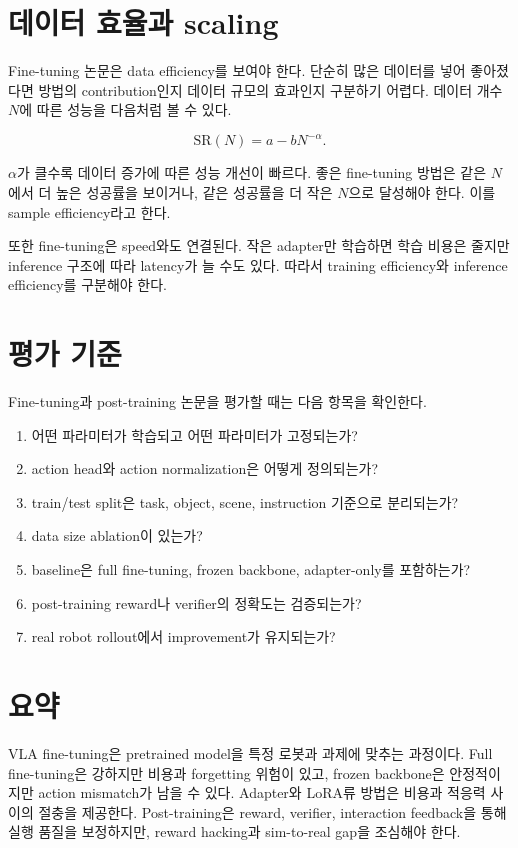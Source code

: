 \section{데이터 효율과 scaling}

Fine-tuning 논문은 data efficiency를 보여야 한다. 단순히 많은 데이터를 넣어 좋아졌다면 방법의 contribution인지 데이터 규모의 효과인지 구분하기 어렵다. 데이터 개수 $N$에 따른 성능을 다음처럼 볼 수 있다.

\begin{equation}
  \mathrm{SR}(N)
  =
  a - bN^{-\alpha}.
\end{equation}

$\alpha$가 클수록 데이터 증가에 따른 성능 개선이 빠르다. 좋은 fine-tuning 방법은 같은 $N$에서 더 높은 성공률을 보이거나, 같은 성공률을 더 작은 $N$으로 달성해야 한다. 이를 sample efficiency라고 한다.

또한 fine-tuning은 speed와도 연결된다. 작은 adapter만 학습하면 학습 비용은 줄지만 inference 구조에 따라 latency가 늘 수도 있다. 따라서 training efficiency와 inference efficiency를 구분해야 한다.

\section{평가 기준}

Fine-tuning과 post-training 논문을 평가할 때는 다음 항목을 확인한다.

\begin{enumerate}
  \item 어떤 파라미터가 학습되고 어떤 파라미터가 고정되는가?
  \item action head와 action normalization은 어떻게 정의되는가?
  \item train/test split은 task, object, scene, instruction 기준으로 분리되는가?
  \item data size ablation이 있는가?
  \item baseline은 full fine-tuning, frozen backbone, adapter-only를 포함하는가?
  \item post-training reward나 verifier의 정확도는 검증되는가?
  \item real robot rollout에서 improvement가 유지되는가?
\end{enumerate}

\section{요약}

VLA fine-tuning은 pretrained model을 특정 로봇과 과제에 맞추는 과정이다. Full fine-tuning은 강하지만 비용과 forgetting 위험이 있고, frozen backbone은 안정적이지만 action mismatch가 남을 수 있다. Adapter와 LoRA류 방법은 비용과 적응력 사이의 절충을 제공한다. Post-training은 reward, verifier, interaction feedback을 통해 실행 품질을 보정하지만, reward hacking과 sim-to-real gap을 조심해야 한다.

